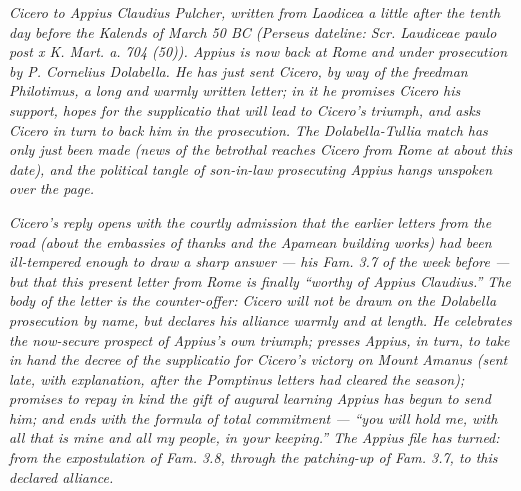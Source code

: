 
\textit{Cicero to Appius Claudius Pulcher, written from
Laodicea a little after the tenth day before the
Kalends of March 50 BC (Perseus dateline: \textit{Scr.
Laudiceae paulo post x K. Mart. a. 704 (50)}). Appius
is now back at Rome and under prosecution by P.
Cornelius Dolabella. He has just sent Cicero, by way of
the freedman Philotimus, a long and warmly written
letter; in it he promises Cicero his support, hopes for
the supplicatio that will lead to Cicero's triumph, and
asks Cicero in turn to back him in the prosecution.
The Dolabella-Tullia match has only just been made
(news of the betrothal reaches Cicero from Rome at
about this date), and the political tangle of son-in-law
prosecuting Appius hangs unspoken over the page.}

\textit{Cicero's reply opens with the courtly admission
that the earlier letters from the road (about the
embassies of thanks and the Apamean building works)
had been ill-tempered enough to draw a sharp answer ---
his \textit{Fam.} 3.7 of the week before --- but that
this present letter from Rome is finally ``worthy of
Appius Claudius.'' The body of the letter is the
counter-offer: Cicero will not be drawn on the
Dolabella prosecution by name, but declares his alliance
warmly and at length. He celebrates the now-secure
prospect of Appius's own triumph; presses Appius, in
turn, to take in hand the decree of the supplicatio
for Cicero's victory on Mount Amanus (sent late, with
explanation, after the Pomptinus letters had cleared
the season); promises to repay in kind the gift of
augural learning Appius has begun to send him; and ends
with the formula of total commitment --- ``you will
hold me, with all that is mine and all my people, in
your keeping.'' The Appius file has turned: from the
expostulation of \textit{Fam.} 3.8, through the
patching-up of \textit{Fam.} 3.7, to this declared
alliance.}
